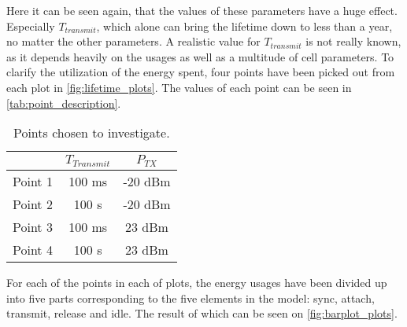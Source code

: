 Here it can be seen again, that the values of these parameters have a huge effect. Especially $T_{transmit}$, which alone can bring the lifetime down to less than a year, no matter the other parameters. A realistic value for $T_{transmit}$ is not really known, as it depends heavily on the usages as well as a multitude of cell parameters. To clarify the utilization of the energy spent, four points have been picked out from each plot in \autoref{fig:lifetime_plots}. The values of each point can be seen in \autoref{tab:point_description}.

\begin{table}[H]
\centering
\begin{tabular}{|c|c|c|} \hline
& $T_{Transmit}$ & $P_{TX}$ \\ \hline
Point 1 & 100 ms& -20 dBm      \\ \hline
Point 2 & 100 s    & -20 dBm      \\ \hline
Point 3 & 100 ms& 23 dBm     \\ \hline
Point 4 & 100 s    & 23 dBm     \\ \hline
\end{tabular}
\caption{Points chosen to investigate.}
\label{tab:point_description}
\end{table} 

For each of the points in each of plots, the energy usages have been divided up into five parts corresponding to the five elements in the model:  sync, attach, transmit, release and idle. The result of which can be seen on \autoref{fig:barplot_plots}.
 

